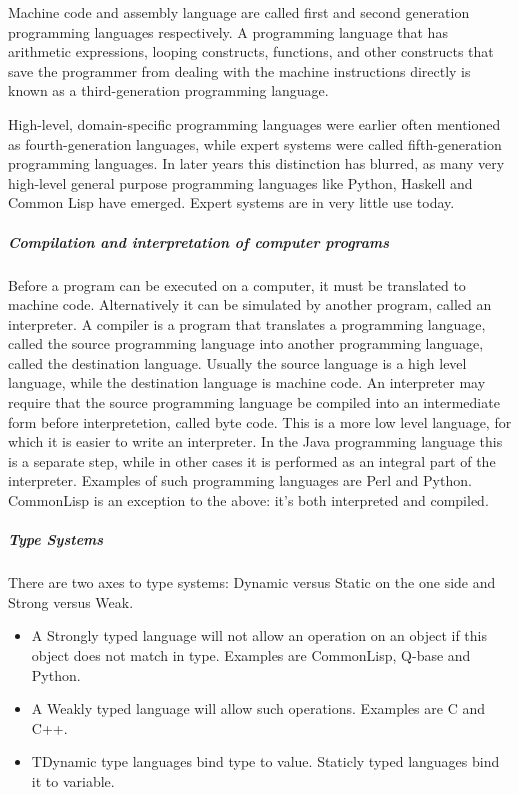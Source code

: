 Machine code and assembly language are called first and second generation programming languages respectively. A programming language that has arithmetic expressions, looping constructs, functions, and other constructs that save the programmer from dealing with the machine instructions directly is known as a third-generation programming language.

High-level, domain-specific programming languages were earlier often mentioned as fourth-generation languages, while expert systems were called fifth-generation programming languages. In later years this distinction has blurred, as many very high-level general purpose programming languages like Python, Haskell and Common Lisp have emerged. Expert systems are in very little use today.\cite{14}

\subparagraph*{Compilation and interpretation of computer programs}
\hfill \break
Before a program can be executed on a computer, it must be translated to machine code. Alternatively it can be simulated by another program, called an interpreter. A compiler is a program that translates a programming language, called the source programming language into another programming language, called the destination language. Usually the source language is a high level language, while the destination language is machine code. An interpreter may require that the source programming language be compiled into an intermediate form before interpretetion, called byte code. This is a more low level language, for which it is easier to write an interpreter. In the Java programming language this is a separate step, while in other cases it is performed as an integral part of the interpreter. Examples of such programming languages are Perl and Python. CommonLisp is an exception to the above: it's both interpreted and compiled.\cite{14}

\subparagraph*{Type Systems}
\hfill \break
There are two axes to type systems: Dynamic versus Static on the one side and Strong versus Weak.\cite{14}

\begin{itemize}
  \item A Strongly typed language will not allow an operation on an object if this object does not match in type. Examples are CommonLisp, Q-base and Python.
  \item A Weakly typed language will allow such operations. Examples are C and C++.
  \item TDynamic type languages bind type to value. Staticly typed languages bind it to variable.
\end{itemize}

